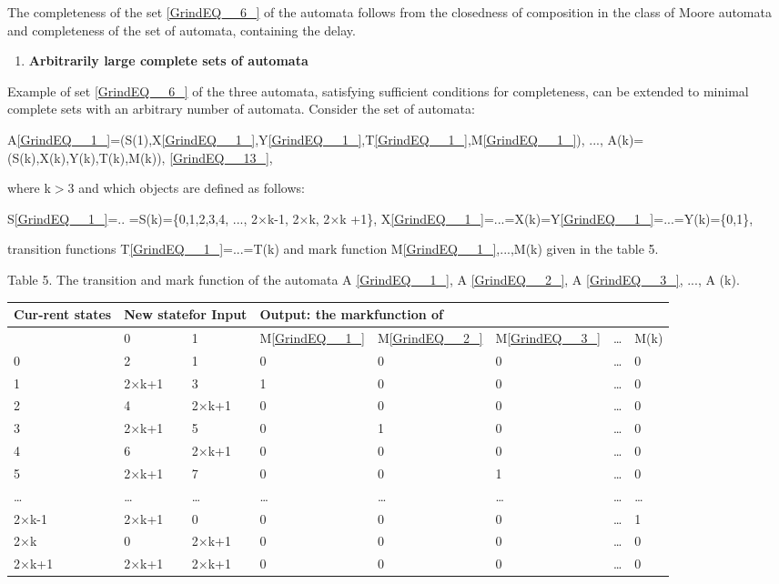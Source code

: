 \documentclass{article}
\begin{document}
The completeness of the set \eqref{GrindEQ__6_} of the automata follows from the closedness of composition in the class of Moore automata and completeness of the set of automata, containing the delay.

\begin{enumerate}
\item  \textbf{Arbitrarily large complete sets of automata}
\end{enumerate}

Example of set \eqref{GrindEQ__6_} of the three automata, satisfying sufficient conditions for completeness, can be extended to minimal complete sets with an arbitrary number of automata. Consider the set of automata:

A\eqref{GrindEQ__1_}=(S(1),X\eqref{GrindEQ__1_},Y\eqref{GrindEQ__1_},T\eqref{GrindEQ__1_},M\eqref{GrindEQ__1_}), ..., A(k)=(S(k),X(k),Y(k),T(k),M(k)),  \eqref{GrindEQ__13_},

where k$>$3 and which objects are defined as follows:

S\eqref{GrindEQ__1_}=.. =S(k)=\{0,1,2,3,4, ..., 2$\times$k-1, 2$\times$k, 2$\times$k +1\}, X\eqref{GrindEQ__1_}=...=X(k)=Y\eqref{GrindEQ__1_}=...=Y(k)=\{0,1\},

transition functions T\eqref{GrindEQ__1_}=...=T(k) and mark function M\eqref{GrindEQ__1_},...,M(k) given in the table 5.

Table 5. The transition and mark function of the automata A \eqref{GrindEQ__1_}, A \eqref{GrindEQ__2_}, A \eqref{GrindEQ__3_}, ..., A (k).

\begin{tabular}{|p{0.3in}|p{0.4in}|p{0.4in}|p{0.2in}|p{0.3in}|p{0.3in}|p{0.1in}|p{0.3in}|} \hline
Cur-rent states & \multicolumn{2}{|p{0.7in}|}{New statefor  Input} & \multicolumn{5}{|p{1.2in}|}{Output: the mark\newline function of} \\ \hline
 & 0 & 1 & M\eqref{GrindEQ__1_} & M\eqref{GrindEQ__2_} & M\eqref{GrindEQ__3_} & \dots  & M(k) \\ \hline
0 & 2 & 1 & 0 & 0 & 0 & \dots  & 0 \\ \hline
1 & 2$\times$k+1 & 3 & 1 & 0 & 0 & \dots  & 0 \\ \hline
2 & 4 & 2$\times$k+1 & 0 & 0 & 0 & \dots  & 0 \\ \hline
3 & 2$\times$k+1 & 5 & 0 & 1 & 0 & \dots  & 0 \\ \hline
4 & 6 & 2$\times$k+1 & 0 & 0 & 0 & \dots  & 0 \\ \hline
5 & 2$\times$k+1 & 7 & 0 & 0 & 1 & \dots  & 0 \\ \hline
\dots  & \dots  & \dots  & \dots  & \dots  & \dots  & \dots  & \dots  \\ \hline
2$\times$k-1 & 2$\times$k+1 & 0 & 0 & 0 & 0 & \dots  & 1 \\ \hline
2$\times$k & 0 & 2$\times$k+1 & 0 & 0 & 0 & \dots  & 0 \\ \hline
2$\times$k+1 & 2$\times$k+1 & 2$\times$k+1 & 0 & 0 & 0 & \dots  & 0 \\ \hline
\end{tabular}
\end{document}
